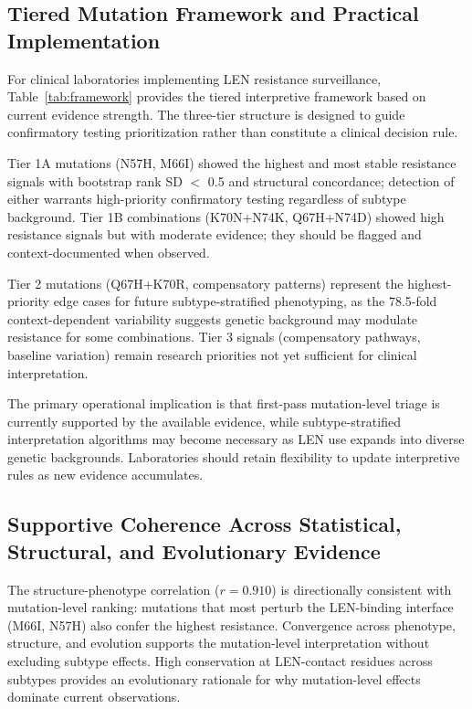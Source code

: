 \documentclass[12pt,a4paper]{article}
\begin{document}
\subsection{Tiered Mutation Framework and Practical Implementation}

For clinical laboratories implementing LEN resistance surveillance, Table~\ref{tab:framework} provides the tiered interpretive framework based on current evidence strength. The three-tier structure is designed to guide confirmatory testing prioritization rather than constitute a clinical decision rule.

Tier 1A mutations (N57H, M66I) showed the highest and most stable resistance signals with bootstrap rank SD $<$ 0.5 and structural concordance; detection of either warrants high-priority confirmatory testing regardless of subtype background. Tier 1B combinations (K70N+N74K, Q67H+N74D) showed high resistance signals but with moderate evidence; they should be flagged and context-documented when observed.

Tier 2 mutations (Q67H+K70R, compensatory patterns) represent the highest-priority edge cases for future subtype-stratified phenotyping, as the 78.5-fold context-dependent variability suggests genetic background may modulate resistance for some combinations. Tier 3 signals (compensatory pathways, baseline variation) remain research priorities not yet sufficient for clinical interpretation.

The primary operational implication is that first-pass mutation-level triage is currently supported by the available evidence, while subtype-stratified interpretation algorithms may become necessary as LEN use expands into diverse genetic backgrounds. Laboratories should retain flexibility to update interpretive rules as new evidence accumulates.

\subsection{Supportive Coherence Across Statistical, Structural, and Evolutionary Evidence}

The structure-phenotype correlation ($r=0.910$) is directionally consistent with mutation-level ranking: mutations that most perturb the LEN-binding interface (M66I, N57H) also confer the highest resistance. Convergence across phenotype, structure, and evolution supports the mutation-level interpretation without excluding subtype effects. High conservation at LEN-contact residues across subtypes provides an evolutionary rationale for why mutation-level effects dominate current observations.
\end{document}
